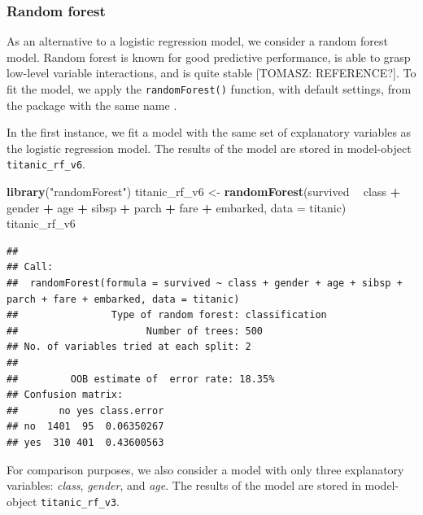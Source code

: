 \documentclass[12pt,]{krantz}
\newenvironment{Shaded}{\begin{snugshade}}{\end{snugshade}}
\newcommand{\DataTypeTok}[1]{\textcolor[rgb]{0.13,0.29,0.53}{#1}}
\newcommand{\KeywordTok}[1]{\textcolor[rgb]{0.13,0.29,0.53}{\textbf{#1}}}
\newcommand{\NormalTok}[1]{#1}
\newcommand{\OperatorTok}[1]{\textcolor[rgb]{0.81,0.36,0.00}{\textbf{#1}}}
\newcommand{\StringTok}[1]{\textcolor[rgb]{0.31,0.60,0.02}{#1}}
\theoremstyle{definition}
\theoremstyle{definition}
\theoremstyle{definition}
\theoremstyle{remark}
\begin{document}
\hypertarget{model_titanic_rf}{%
\subsubsection{Random forest}\label{model_titanic_rf}}

As an alternative to a logistic regression model, we consider a random
forest model. Random forest is known for good predictive performance, is
able to grasp low-level variable interactions, and is quite stable
{[}TOMASZ: REFERENCE?{]}. To fit the model, we apply the
\texttt{randomForest()} function, with default settings, from the
package with the same name \citep{randomForestRNews}.

In the first instance, we fit a model with the same set of explanatory
variables as the logistic regression model. The results of the model are
stored in model-object \texttt{titanic\_rf\_v6}.

\begin{Shaded}
\begin{Highlighting}[]
\KeywordTok{library}\NormalTok{(}\StringTok{"randomForest"}\NormalTok{)}
\NormalTok{titanic_rf_v6 <-}\StringTok{ }\KeywordTok{randomForest}\NormalTok{(survived }\OperatorTok{~}\StringTok{ }\NormalTok{class }\OperatorTok{+}\StringTok{ }\NormalTok{gender }\OperatorTok{+}\StringTok{ }\NormalTok{age }\OperatorTok{+}\StringTok{ }\NormalTok{sibsp }\OperatorTok{+}\StringTok{ }\NormalTok{parch }\OperatorTok{+}\StringTok{ }\NormalTok{fare }\OperatorTok{+}\StringTok{ }\NormalTok{embarked, }
                           \DataTypeTok{data =}\NormalTok{ titanic)}
\NormalTok{titanic_rf_v6}
\end{Highlighting}
\end{Shaded}

\begin{verbatim}
## 
## Call:
##  randomForest(formula = survived ~ class + gender + age + sibsp +      parch + fare + embarked, data = titanic) 
##                Type of random forest: classification
##                      Number of trees: 500
## No. of variables tried at each split: 2
## 
##         OOB estimate of  error rate: 18.35%
## Confusion matrix:
##       no yes class.error
## no  1401  95  0.06350267
## yes  310 401  0.43600563
\end{verbatim}

For comparison purposes, we also consider a model with only three
explanatory variables: \emph{class}, \emph{gender}, and \emph{age}. The
results of the model are stored in model-object
\texttt{titanic\_rf\_v3}.
\end{document}
